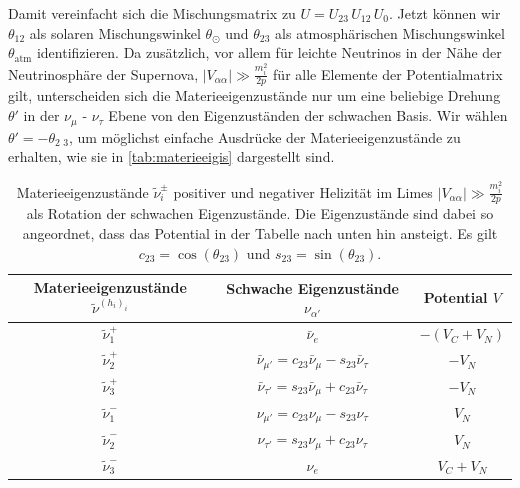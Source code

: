 Damit vereinfacht sich die Mischungsmatrix zu $U = U_{2 3} \, U_{1 2} \, U_0$.
Jetzt können wir $\theta_{1 2}$ als solaren Mischungswinkel $\theta_\odot$ und $\theta_{2 3}$ als atmosphärischen Mischungswinkel $\theta_\text{atm}$ identifizieren.
Da zusätzlich, vor allem für leichte Neutrinos in der Nähe der Neutrinosphäre der Supernova, $|V_{\alpha \alpha}| \gg \frac{m^2_i}{2 p}$ für alle Elemente der Potentialmatrix gilt, unterscheiden sich die Materieeigenzustände nur um eine
beliebige Drehung $\theta'$ in der $\nu_\mu$ - $\nu_\tau$ Ebene von den Eigenzuständen der schwachen Basis.
Wir wählen $\theta' = -\theta_\text{2 3}$, um möglichst einfache Ausdrücke der Materieeigenzustände zu erhalten, wie sie in \autoref{tab:materieeigis} dargestellt sind.
\begin{table}[H]
    \centering
    \begin{tabular}{S S S}
      \toprule
    {Materieeigenzustände $\tilde{\nu}^{(h_i)_i}$} & {Schwache Eigenzustände $\nu_{\alpha'}$} & {Potential $V$} \\
      \midrule
       {$\tilde{\nu}^+_1$} & {$\bar{\nu}_e$}                                                        &  {$- (V_C + V_N)$} \\
       {$\tilde{\nu}^+_2$} & {$\bar{\nu}_{\mu'}  = c_{2 3} \bar{\nu}_\mu - s_{2 3} \bar{\nu}_\tau$} &  {$- V_N$} \\
       {$\tilde{\nu}^+_3$} & {$\bar{\nu}_{\tau'} = s_{2 3} \bar{\nu}_\mu + c_{2 3} \bar{\nu}_\tau$} &  {$- V_N$} \\
       {$\tilde{\nu}^-_1$} & {$\nu_{\mu'}        = c_{2 3} \nu_\mu       - s_{2 3} \nu_\tau$}       &  {$V_N$} \\
       {$\tilde{\nu}^-_2$} & {$\nu_{\tau'}       = s_{2 3} \nu_\mu       + c_{2 3} \nu_\tau$}       &  {$V_N$} \\
       {$\tilde{\nu}^-_3$} & {$\nu_e$}                                                              &  {$V_C + V_N$} \\
    \bottomrule
    \end{tabular}
    \caption{Materieeigenzustände $\tilde{\nu}^\pm_i$ positiver und negativer Helizität im Limes $|V_{\alpha \alpha}| \gg \frac{m^2_i}{2 p}$ als Rotation der schwachen Eigenzustände. Die Eigenzustände sind dabei so
            angeordnet, dass das Potential in der Tabelle nach unten hin ansteigt. Es gilt $c_{2 3} = \cos(\theta_{2 3})$ und $s_{2 3} = \sin(\theta_{2 3})$.}
    \label{tab:materieeigis}
\end{table}

